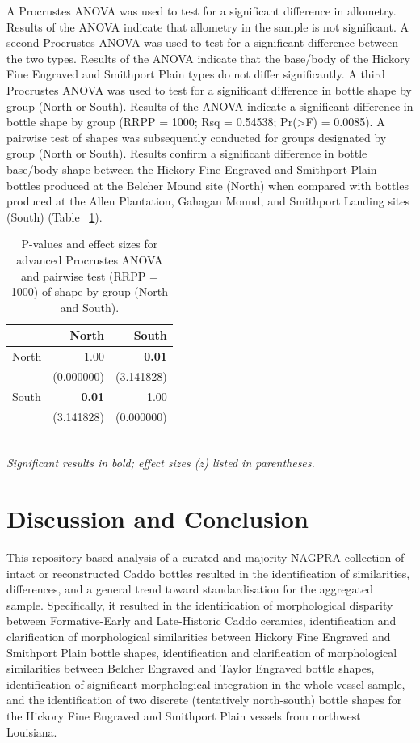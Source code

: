 \documentclass[review]{elsarticle}
\begin{document}
A Procrustes ANOVA was used to test for a significant difference in allometry. Results of the ANOVA indicate that allometry in the sample is not significant. A second Procrustes ANOVA was used to test for a significant difference between the two types. Results of the ANOVA indicate that the base/body of the Hickory Fine Engraved and Smithport Plain types do not differ significantly. A third Procrustes ANOVA was used to test for a significant difference in bottle shape by group (North or South). Results of the ANOVA indicate a significant difference in bottle shape by group (RRPP = 1000; Rsq = 0.54538; Pr(>F) = 0.0085). A pairwise test of shapes was subsequently conducted for groups designated by group (North or South). Results confirm a significant difference in bottle base/body shape between the Hickory Fine Engraved and Smithport Plain bottles produced at the Belcher Mound site (North) when compared with bottles produced at the Allen Plantation, Gahagan Mound, and Smithport Landing sites (South) (Table ~\ref{tab:Tblpairbba}).

\begin{table}[htbp]\centering
\footnotesize
\caption{P-values and effect sizes for advanced Procrustes ANOVA and pairwise test (RRPP = 1000) of shape by group (North and South).}
\centering
\begin{tabular}{lrr}
\toprule
 & North & South\\
\midrule
North & 1.00 & \textbf{0.01}\\
 & (0.000000) & (3.141828)\\
South & \textbf{0.01} & 1.00\\
 & (3.141828) & (0.000000)\\
\bottomrule
\end{tabular}\\
\smallskip
\textit{Significant results in bold; effect sizes (z) listed in parentheses.}
\label{tab:Tblpairbba}
\end{table}

\section{Discussion and Conclusion}

This repository-based analysis of a curated and majority-NAGPRA collection of intact or reconstructed Caddo bottles resulted in the identification of similarities, differences, and a general trend toward standardisation for the aggregated sample. Specifically, it resulted in the identification of morphological disparity between Formative-Early and Late-Historic Caddo ceramics, identification and clarification of morphological similarities between Hickory Fine Engraved and Smithport Plain bottle shapes, identification and clarification of morphological similarities between Belcher Engraved and Taylor Engraved bottle shapes, identification of significant morphological integration in the whole vessel sample, and the identification of two discrete (tentatively north-south) bottle shapes for the Hickory Fine Engraved and Smithport Plain vessels from northwest Louisiana. 
\end{document}
